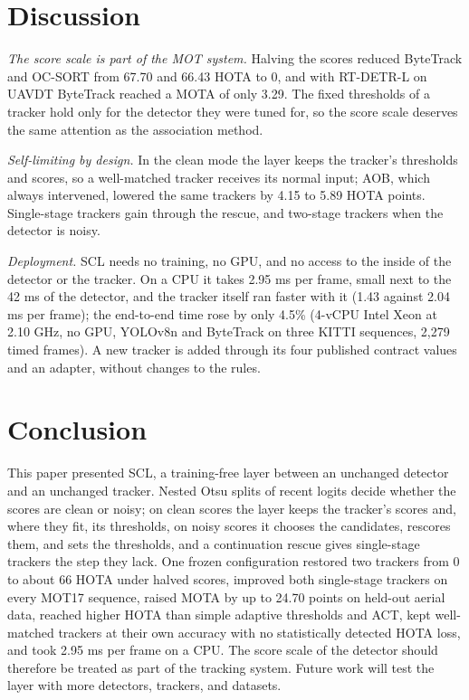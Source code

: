 \documentclass[pdflatex,sn-mathphys-num,iicol]{sn-jnl}
\newcommand{\scl}{SCL}
\newcommand{\aob}{AOB}
\begin{document}
\section{Discussion}\label{sec:discussion}

\emph{The score scale is part of the MOT system.} Halving the scores reduced ByteTrack and OC-SORT
from 67.70 and 66.43 HOTA to 0, and with RT-DETR-L on UAVDT ByteTrack reached a MOTA of only 3.29.
The fixed thresholds of a tracker hold only for the detector they were tuned for, so the score
scale deserves the same attention as the association method.

\emph{Self-limiting by design.} In the clean mode the layer keeps the tracker's thresholds and
scores, so a well-matched tracker receives its normal input; \aob{}, which always intervened,
lowered the same trackers by 4.15 to 5.89 HOTA points. Single-stage trackers gain through the
rescue, and two-stage trackers when the detector is noisy.

\emph{Deployment.} \scl{} needs no training, no GPU, and no access to the inside of the detector or
the tracker. On a CPU it takes 2.95 ms per frame, small next to the 42 ms of the detector, and the
tracker itself ran faster with it (1.43 against 2.04 ms per frame); the end-to-end time rose by
only 4.5\% (4-vCPU Intel Xeon at 2.10 GHz, no GPU, YOLOv8n and ByteTrack on three KITTI sequences,
2,279 timed frames). A new tracker is added through its four published contract
values and an adapter, without changes to the rules.
\section{Conclusion}\label{sec:conclusion}

This paper presented \scl{}, a training-free layer between an unchanged detector and an unchanged
tracker. Nested Otsu splits of recent logits decide whether the scores are clean or noisy; on clean
scores the layer keeps the tracker's scores and, where they fit, its thresholds, on noisy scores it chooses the candidates, rescores
them, and sets the thresholds, and a continuation rescue gives single-stage trackers the step they
lack. One frozen configuration restored two trackers from 0 to about 66 HOTA under halved scores,
improved both single-stage trackers on every MOT17 sequence, raised MOTA by up to 24.70 points on
held-out aerial data, reached higher HOTA than simple adaptive thresholds and ACT, kept well-matched
trackers at their own accuracy with no statistically detected HOTA loss, and took 2.95 ms per frame on a CPU. The score scale of the detector should therefore be treated as part of
the tracking system. Future work will test the layer with more detectors, trackers, and datasets.
\end{document}
